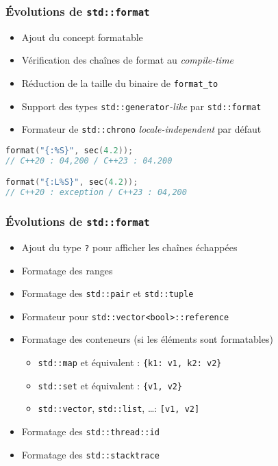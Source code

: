 \documentclass[C++.tex]{subfiles}
\begin{document}
\begin{frame}[fragile]
	\frametitle{Évolutions de \lstinline|std::format|}
	\begin{itemize}
		\item Ajout du concept formatable
		\item Vérification des chaînes de format au \textit{compile-time}
		\item Réduction de la taille du binaire de \lstinline|format_to|
		\item Support des types \lstinline|std::generator|\textit{-like} par \lstinline|std::format|
		\item Formateur de \lstinline|std::chrono| \textit{locale-independent} par défaut

	\end{itemize}

	\begin{lstlisting}[language=C++]
format("{:%S}", sec(4.2));
// C++20 : 04,200 / C++23 : 04.200

format("{:L%S}", sec(4.2));
// C++20 : exception / C++23 : 04,200\end{lstlisting}
\end{frame}

\begin{frame}[fragile]
	\frametitle{Évolutions de \lstinline|std::format|}
	\begin{itemize}
		\item Ajout du type \lstinline|?| pour afficher les chaînes échappées
		\item Formatage des ranges
		\item Formatage des \lstinline|std::pair| et \lstinline|std::tuple|
		\item Formateur pour \lstinline|std::vector<bool>::reference|
		\item Formatage des conteneurs (si les éléments sont formatables)
		\begin{itemize}
			\item \lstinline|std::map| et équivalent : \lstinline|{k1: v1, k2: v2}|
			\item \lstinline|std::set| et équivalent : \lstinline|{v1, v2}|
			\item \lstinline|std::vector|, \lstinline|std::list|, \ldots : \lstinline|[v1, v2]|
		\end{itemize}
		\item Formatage des \lstinline|std::thread::id|
		\item Formatage des \lstinline|std::stacktrace|
	\end{itemize}
\end{frame}
\end{document}

